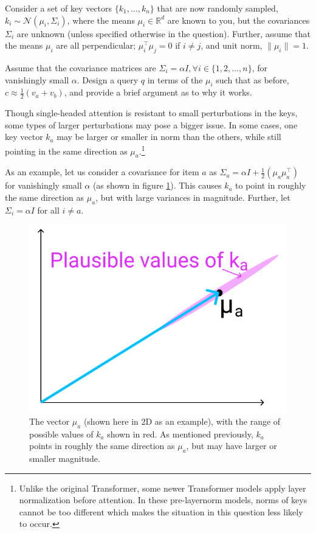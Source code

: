 \begin{parts}
Consider a set of key vectors $\{k_1,\dots,k_n\}$ that are now randomly sampled, $k_i\sim \mathcal{N}(\mu_i, \Sigma_i)$, where the means $\mu_i \in \mathbb{R}^d$ are known to you, but the covariances $\Sigma_i$ are unknown (unless specified otherwise in the question).
Further, assume that the means $\mu_i$ are all perpendicular; $\mu_i^\top \mu_j = 0$ if $i\not=j$, and unit norm, $\|\mu_i\|=1$.

\begin{subparts}
\subpart[2] Assume that the covariance matrices are $\Sigma_i = \alpha I, \forall i \in \{1, 2, \ldots, n\}$, for vanishingly small $\alpha$.
Design a query $q$ in terms of the $\mu_i$ such that as before, $c\approx \frac{1}{2}(v_a + v_b)$, and provide a brief argument as to why it works.

\subpart[3] Though single-headed attention is resistant to small perturbations in the keys, some types of larger perturbations may pose a bigger issue. In some cases, one key vector $k_a$ may be larger or smaller in norm than the others, while still pointing in the same direction as $\mu_a$.\footnote{Unlike the original Transformer, some newer Transformer models apply layer normalization before attention. In these pre-layernorm models, norms of keys cannot be too different which makes the situation in this question less likely to occur.}

As an example, let us consider a covariance for item $a$ as $\Sigma_a = \alpha I + \frac{1}{2}(\mu_a\mu_a^\top)$ for vanishingly small $\alpha$ (as shown in figure \ref{ka_plausible}). This causes $k_a$ to point in roughly the same direction as $\mu_a$, but with large variances in magnitude. Further, let $\Sigma_i = \alpha I$ for all $i \neq a$.
\begin{figure}[h]
\centering
\captionsetup{justification=centering,margin=2cm}
\includegraphics[width=0.35\linewidth]{images/ka_plausible.png}
\caption{The vector $\mu_a$ (shown here in 2D as an example), with the range of possible values of $k_a$ shown in red. As mentioned previously, $k_a$ points in roughly the same direction as $\mu_a$, but may have larger or smaller magnitude.}
\label{ka_plausible}
\end{figure}


\end{subparts}
\end{parts}
